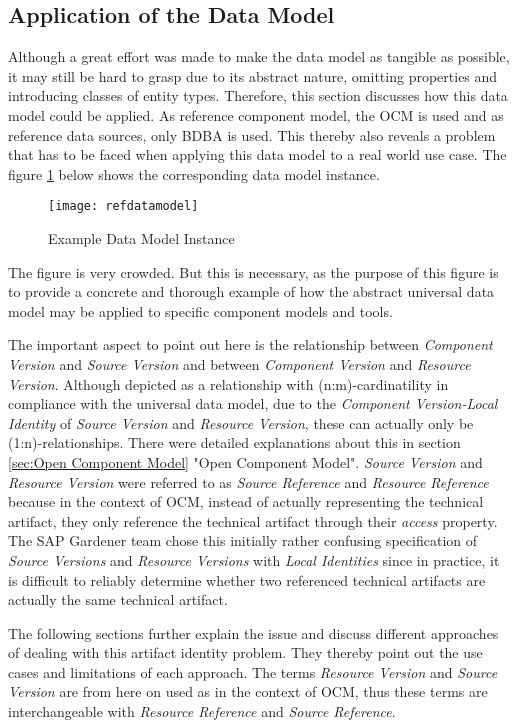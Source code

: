 \subsection{Application of the Data Model}
Although a great effort was made to make the data model as tangible as possible, it may still be hard to grasp due to its abstract nature, omitting properties and introducing classes of entity types. Therefore, this section discusses how this data model could be applied. As reference component model, the OCM is used and as reference data sources, only BDBA is used. This thereby also reveals a problem that has to be faced when applying this data model to a real world use case. The figure \ref{fig:RefDataModel} below shows the corresponding data model instance.\par

\begin{figure}[H]
	\centering
	\texttt{[image: refdatamodel]}
	\caption[Data Model]{Example Data Model Instance }
	\label{fig:RefDataModel}
\end{figure}

The figure is very crowded. But this is necessary, as the purpose of this figure is to provide a concrete and thorough example of how the abstract universal data model may be applied to specific component models and tools.\par
The important aspect to point out here is the relationship between \emph{Component Version} and \emph{Source Version} and between \emph{Component Version} and \emph{Resource Version}. Although depicted as a relationship with (n:m)-cardinatility in compliance with the universal data model, due to the \emph{Component Version-Local Identity} of \emph{Source Version} and \emph{Resource Version}, these can actually only be (1:n)-relationships. There were detailed explanations about this in section \ref{sec:Open Component Model} "Open Component Model". \emph{Source Version} and \emph{Resource Version} were referred to as \emph{Source Reference} and \emph{Resource Reference} because in the context of OCM, instead of actually representing the technical artifact, they only reference the technical artifact through their \emph{access} property. The SAP Gardener team chose this initially rather confusing specification of \emph{Source Versions} and \emph{Resource Versions} with \emph{Local Identities} since in practice, it is difficult to reliably determine whether two referenced technical artifacts are actually the same technical artifact.\par 
The following sections further explain the issue and discuss different approaches of dealing with this artifact identity problem. They thereby point out the use cases and limitations of each approach. The terms \emph{Resource Version} and \emph{Source Version} are from here on used as in the context of OCM, thus these terms are interchangeable with \emph{Resource Reference} and \emph{Source Reference}. 

